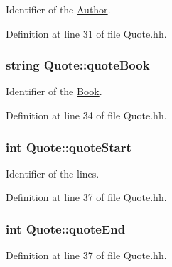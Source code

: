Identifier of the \hyperlink{class_author}{Author}. 



Definition at line 31 of file Quote.\+hh.

\subsubsection[{\texorpdfstring{quote\+Book}{quoteBook}}]{\setlength{\rightskip}{0pt plus 5cm}string Quote\+::quote\+Book\hspace{0.3cm}{\ttfamily [private]}}\hypertarget{class_quote_a7e6968e086bdd45b40627a37ecbbf6fc}{}\label{class_quote_a7e6968e086bdd45b40627a37ecbbf6fc}


Identifier of the \hyperlink{class_book}{Book}. 



Definition at line 34 of file Quote.\+hh.

\subsubsection[{\texorpdfstring{quote\+Start}{quoteStart}}]{\setlength{\rightskip}{0pt plus 5cm}int Quote\+::quote\+Start\hspace{0.3cm}{\ttfamily [private]}}\hypertarget{class_quote_ac426122ac24638740b2a5c5e8342e8c9}{}\label{class_quote_ac426122ac24638740b2a5c5e8342e8c9}


Identifier of the lines. 



Definition at line 37 of file Quote.\+hh.

\subsubsection[{\texorpdfstring{quote\+End}{quoteEnd}}]{\setlength{\rightskip}{0pt plus 5cm}int Quote\+::quote\+End\hspace{0.3cm}{\ttfamily [private]}}\hypertarget{class_quote_aa5953a477b96183c8dc2fc8a42001c29}{}\label{class_quote_aa5953a477b96183c8dc2fc8a42001c29}


Definition at line 37 of file Quote.\+hh.

